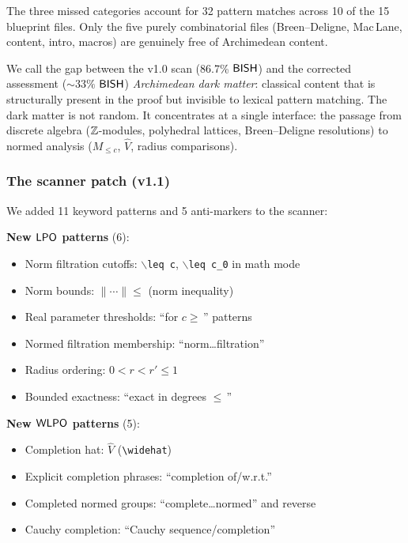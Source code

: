 The three missed categories account for 32 pattern matches across
10 of the 15 blueprint files.  Only the five purely combinatorial
files (Breen--Deligne, Mac\,Lane, content, intro, macros) are genuinely
free of Archimedean content.

We call the gap between the v1.0 scan (86.7\% $\textsf{BISH}$) and the
corrected assessment (${\sim}33\%$ $\textsf{BISH}$) \emph{Archimedean dark
matter}: classical content that is structurally present in the proof
but invisible to lexical pattern matching.  The dark matter is not
random.  It concentrates at a single interface: the passage from
discrete algebra ($\mathbb{Z}$-modules, polyhedral lattices, Breen--Deligne
resolutions) to normed analysis ($M_{\leq c}$, $\widehat{V}$,
radius comparisons).

\subsubsection{The scanner patch (v1.1)}\label{sec:patch}

We added 11 keyword patterns and 5 anti-markers to the scanner:

\medskip
\noindent\textbf{New $\textsf{LPO}$ patterns} (6):

\begin{itemize}[nosep]
\item Norm filtration cutoffs: $\backslash$\texttt{leq c},
  $\backslash$\texttt{leq c\_0} in math mode
\item Norm bounds: $\|{\cdots}\| \leq$ (norm inequality)
\item Real parameter thresholds: ``for $c \geq$\,'' patterns
\item Normed filtration membership: ``norm\dots filtration''
\item Radius ordering: $0 < r < r' \leq 1$
\item Bounded exactness: ``exact in degrees $\leq$\,''
\end{itemize}

\noindent\textbf{New $\textsf{WLPO}$ patterns} (5):

\begin{itemize}[nosep]
\item Completion hat: $\widehat{V}$ (\texttt{\textbackslash widehat})
\item Explicit completion phrases: ``completion of/w.r.t.''
\item Completed normed groups: ``complete\dots normed'' and reverse
\item Cauchy completion: ``Cauchy sequence/completion''
\end{itemize}

